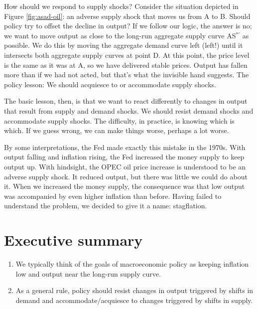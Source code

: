 How should we respond to supply shocks? 
Consider the situation depicted in Figure \ref{fig:asad-oil}:
an adverse supply shock that moves us from A to B.
Should policy try to offset the decline in output?
If we follow our logic, the answer is no;
we want to move output as close to the long-run aggregate supply 
curve AS$^{*\prime}$ as possible.
We do this by moving the aggregate demand
 curve left (left!) until it intersects
both aggregate supply
 curves at point D.
At this point, the price level is the same as it was at A,
so we have delivered stable prices.
Output has fallen more than if we had not acted,
but that's what the invisible hand suggests.
The policy lesson:  We should acquiesce to or accommodate
supply shocks.

The basic lesson, then, is that we want to react differently to
changes in output that result from supply and demand shocks.
We should resist demand shocks and accommodate supply shocks.
The difficulty, in practice, is knowing which is which.
If we guess wrong, we can make things worse, perhaps a lot worse.

By some interpretations, the Fed made exactly this mistake in the 1970s.
With output falling and inflation rising, the Fed increased the money
supply to keep output up.
With hindsight, the OPEC oil price increase is understood to be an
adverse supply shock.
It reduced output, but there was little we could do about it.
When we increased the money supply, the consequence was that low
output was accompanied by even higher inflation than before.
Having failed to understand the problem,
we decided to give it a name:  stagflation.


\section*{Executive summary}

\setlength{\leftmargini}{.5\oldleftmargini}
\begin{enumerate}
\item We typically think of the goals of macroeconomic
policy as keeping inflation low and output near the long-run
supply curve.

\item As a general rule, policy should resist changes in output
triggered by shifts in demand and accommodate/acquiesce
to changes triggered by shifts in supply.
\end{enumerate}
\setlength{\leftmargini}{\oldleftmargini}

